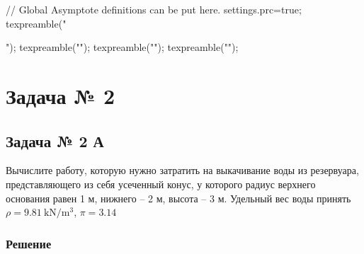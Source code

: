\documentclass[a4paper,12pt]{article}
\begin{document}
\begin{asydef}
// Global Asymptote definitions can be put here.
settings.prc=true;
texpreamble("\usepackage{xltxtra,unicode-math}");
texpreamble("\setmainfont{Times New Roman}");
texpreamble("\setsansfont{Arial}\setmonofont{Courier New}");
texpreamble("");
\end{asydef}

%
%

\section{Задача № 2}

\subsection{Задача № 2 А}

Вычислите работу, которую нужно затратить на выкачивание воды из резервуара,
представляющего из себя усеченный конус,
у которого радиус верхнего основания равен 1 м, нижнего – 2 м, высота – 3 м.
Удельный вес воды принять \(\rho = \SI{9.81}{\kN\per\cubic\metre}\),
\(\pi = \num{3.14}\)

\subsubsection{Решение}
\end{document}
